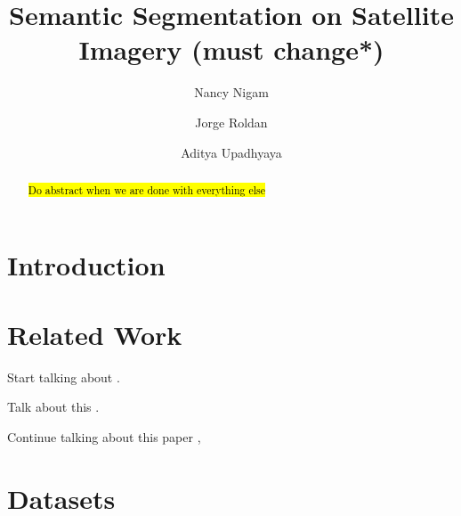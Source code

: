 \documentclass[sigconf, nonacm]{acmart}
\begin{document}
\title{Semantic Segmentation on Satellite Imagery (must change*)\\}

\author{Nancy Nigam}

\author{Jorge Roldan}

\author{Aditya Upadhyaya}


\maketitle


\begin{abstract}
\hl{Do abstract when we are done with everything else}
\end{abstract}

\section{Introduction}

\section{Related Work}
Start talking about \cite{DBLP:journals/corr/abs-2003-02899}. \\ \indent


Talk about this \cite{DBLP:journals/corr/abs-2010-06285}. \\ \indent



Continue talking about this paper \cite{DBLP:journals/corr/abs-1911-12903},




\section{Datasets}
\end{document}
